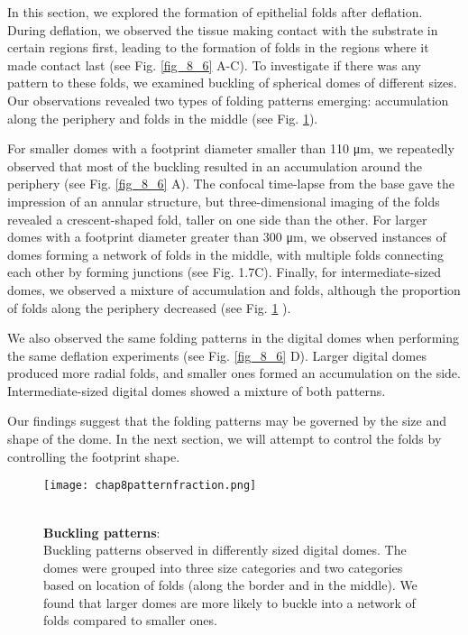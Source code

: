 In this section, we explored the formation of epithelial folds after deflation. During deflation, we observed the tissue making contact with the substrate in certain regions first, leading to the formation of folds in the regions where it made contact last (see Fig. \ref{fig_8_6} A-C). To investigate if there was any pattern to these folds, we examined buckling of spherical domes of different sizes. Our observations revealed two types of folding patterns emerging: accumulation along the periphery and folds in the middle (see Fig. \ref{fig_8_5}).

For smaller domes with a footprint diameter smaller than 110 \unit{\um}, we repeatedly observed that most of the buckling resulted in an accumulation around the periphery (see Fig. \ref{fig_8_6} A). The confocal time-lapse from the base gave the impression of an annular structure, but three-dimensional imaging of the folds revealed a crescent-shaped fold, taller on one side than the other. For larger domes with a footprint diameter greater than 300 \unit{\um}, we observed instances of domes forming a network of folds in the middle, with multiple folds connecting each other by forming junctions (see Fig. 1.7C). Finally, for intermediate-sized domes, we observed a mixture of accumulation and folds, although the proportion of folds along the periphery decreased (see Fig. \ref{fig_8_5} ).

We also observed the same folding patterns in the digital domes when performing the same deflation experiments (see Fig. \ref{fig_8_6} D). Larger digital domes produced more radial folds, and smaller ones formed an accumulation on the side. Intermediate-sized digital domes showed a mixture of both patterns.

Our findings suggest that the folding patterns may be governed by the size and shape of the dome. In the next section, we will attempt to control the folds by controlling the footprint shape.

\begin{figure}[b!]
	\begin{minipage}[c]{0.5\textwidth}
		\texttt{[image: chap8patternfraction.png]}
	\end{minipage}\hfill
	\begin{minipage}[c]{0.45\textwidth}
		\caption{\\ \textbf{Buckling patterns}:\\ 
			Buckling patterns observed in differently sized digital domes. The domes were grouped into three size categories and two categories based on location of folds (along the border and in the middle). We found that larger domes are more likely to buckle into a network of folds compared to smaller ones.
		} \label{fig_8_5}
	\end{minipage}
\end{figure}

